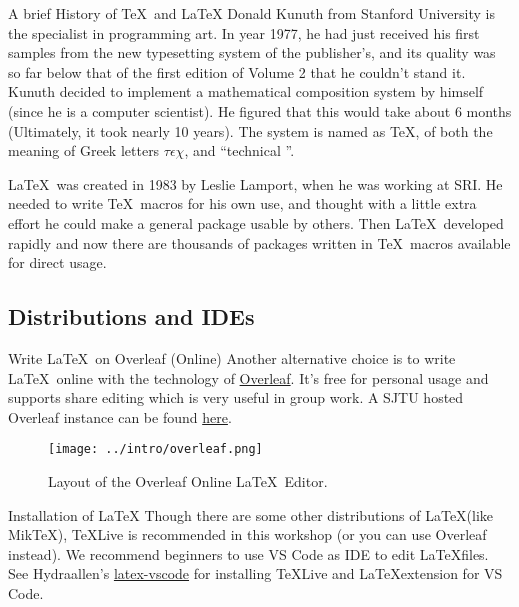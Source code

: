 \begin{frame}{A brief History of \TeX\ and \LaTeX}
    Donald Kunuth from Stanford University is the specialist in programming art. In year 1977, he had just received his first samples from the new typesetting system of the publisher's, and its quality was so far below that of the first edition of Volume 2 that he couldn't stand it. Kunuth decided to implement a mathematical composition system by himself (since he is a computer scientist). He figured that this would take about 6 months (Ultimately, it took nearly 10 years). The system is named as \TeX, of both the meaning of Greek letters $\tau\epsilon\chi$, and ``technical ''. \medskip

    \LaTeX\ was created in 1983 by Leslie Lamport, when he was working at SRI. He needed to write \TeX\ macros for his own use, and thought with a little extra effort he could make a general package usable by others. Then \LaTeX\  developed rapidly and now there are thousands of packages written in \TeX\ macros available for direct usage.

\end{frame}

\subsection{Distributions and IDEs}

\begin{frame}{Write \LaTeX\ on Overleaf (Online)}
    Another alternative choice is to write \LaTeX\ online with the technology of \href{https://www.overleaf.com/}{Overleaf}.
    It's free for personal usage and supports share editing which is very useful in group work.
    A SJTU hosted Overleaf instance can be found \href{https://latex.sjtu.edu.cn/}{here}.
    \begin{figure}
        \centering
        \texttt{[image: ../intro/overleaf.png]}
        \caption{Layout of the Overleaf Online \LaTeX\ Editor.}
    \end{figure}
\end{frame}


\begin{frame}{Installation of \LaTeX}
    Though there are some other distributions of \LaTeX (like Mik\TeX), \TeX Live is recommended in this workshop (or you can use Overleaf instead).
    We recommend beginners to use VS Code as IDE to edit \LaTeX files.
    See Hydraallen's \href{https://github.com/Hydraallen/Latex-vscode}{latex-vscode} for installing \TeX Live and \LaTeX extension for VS Code.
\end{frame}

